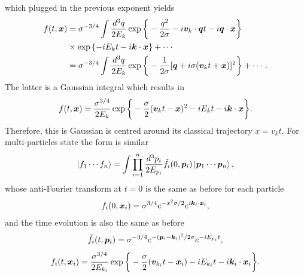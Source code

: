 which plugged in the previous exponent yields 
\begin{equation}
    \begin{split}
        f(t,\bm{x}) &= \sigma^{-3/4}\int \frac{d^3q}{2E_k}\exp{\bigg\{-\frac{q^2}{2\sigma} - i\bm{v}_k\cdot \bm{q}t - i\bm{q}\cdot\bm{x}\bigg\}} \\
        &\times \exp{\{-iE_kt - i\bm{k}\cdot\bm{x}\}} + \cdots \\
        &= \sigma^{-3/4}\int \frac{d^3q}{2E_k}\exp{\bigg\{-\frac{1}{2\sigma}[\bm{q} + i\sigma(\bm{v}_kt + \bm{x})]^2\bigg\}}+ \cdots.
    \end{split}
\end{equation}
The latter is a Gaussian integral which results in 
\begin{equation}
    f(t,\bm{x}) = \frac{\sigma^{3/4}}{2E_k}\exp{\bigg\{-\frac{\sigma}{2}(\bm{v}_kt - \bm{x})^2 - iE_kt - i\bm{k}\cdot\bm{x}\bigg\}}.
\end{equation}
Therefore, this is Gaussian is centred around its classical trajectory $x = v_kt$. For multi-particles state the form is similar
\begin{equation}
    \ket{f_1\cdots f_n} = \int \prod_{i=1}^n\frac{d^3p_i}{2E_{p_i}}\tilde{f}_i(0,\bm{p}_i)\ket{\bm{p}_1\cdots\bm{p}_n},
\end{equation}
whose anti-Fourier transform at $t = 0$ is the same as before for each particle 
\begin{equation}
    f_i(0,\bm{x}_i) = \sigma^{3/4}e^{-x^2\sigma/2}e^{i\bm{k}_i\cdot\bm{x}_i},
\end{equation}
and the time evolution is also the same as before 
\begin{equation}
    \tilde{f}_i(t,\bm{p}_i) = \sigma^{-3/4}e^{-(\bm{p}_i - \bm{k}_i)^2/2\sigma}e^{-iE_{p_i}t},
\end{equation}
\begin{equation}
    f_i(t,\bm{x}_i) = \frac{\sigma^{3/4}}{2E_{k_i}}\exp{\bigg\{-\frac{\sigma}{2}(\bm{v}_{k_i}t - \bm{x}_i) - iE_{k_i}t - i\bm{k}_i\cdot\bm{x}_i\bigg\}}.
\end{equation}

